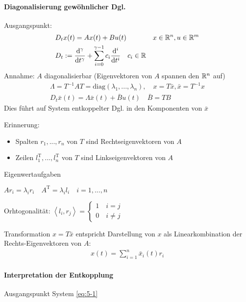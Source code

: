 \paragraph{Diagonalisierung gewöhnlicher Dgl.}

Ausgangspunkt:
\begin{subequations}
\label{eq:5-1}
\begin{align}
&D_tx(t) = Ax(t)+Bu(t) &x \in \mathbb{R}^n, u \in \mathbb{R}^m \\
&D_t := \frac{\mathrm{d}^\gamma}{\mathrm{d} t^\gamma}+ \sum_{i=0}^{\gamma-1}c_i\frac{\mathrm{d}^i}{\mathrm{d} t^i} \quad c_i \in \mathbb{R}
\end{align}
\end{subequations}
Annahme: $A$ diagonalisierbar (Eigenvektoren von $A$ spannen den $\mathbb{R}^n$ auf)
\begin{align*}
\Lambda = T^{-1}AT = \textrm{diag}(\lambda_1,...,\lambda_n), \quad x=T\bar{x}, \bar{x}=T^{-1}x \\
D_t\bar{x}(t)= \Lambda\bar{x}(t)+\bar{B}u(t) \quad \bar{B} = TB
\end{align*}
Dies führt auf System entkoppelter Dgl. in den Komponenten von $\bar{x}$

Erinnerung: 
\begin{itemize}
\item Spalten $r_1,...,r_n$ von $T$ sind Rechtseigenvektoren von $A$

\item Zeilen $l_1^\textrm{T}, ..., l_n^\textrm{T}$ von $T$ sind Linkseigenvektoren von $A$
\end{itemize}
Eigenwertaufgaben

$Ar_i = \lambda_i r_i \quad A^\textrm{T} = \lambda_i l_i \quad i=1,...,n$ 

Orhtogonalität:
$\left\langle l_i, r_j \right\rangle = \begin{cases}1 \quad i=j \\ 0 \quad i \neq j \end{cases}$

Transformation $x=T\bar{x}$ entspricht Darstellung von $x$ als Linearkombination der Rechts-Eigenvektoren von $A$:
\begin{align}
\label{eq:5-2}
x(t) = \sum_{i=1}^{n}\bar{x}_i(t)r_i
\end{align}
\paragraph{Interpretation der Entkopplung}
Ausgangspunkt System \eqref{eq:5-1}

